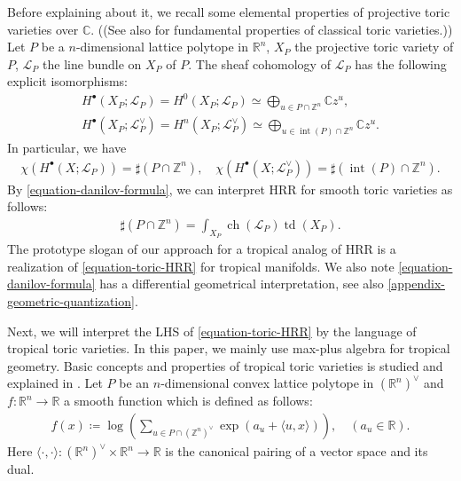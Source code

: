 \documentclass[a4paper,dvipdfmx,reqno,12pt]{amsart}
\theoremstyle{definition}
\newcommand{\deq}{\coloneqq}
\newcommand{\opn}[1]{\operatorname{#1}}
\newcommand{\abk}[1]{\langle {#1} \rangle}%
\numberwithin{equation}{section}
\begin{document}
Before explaining about it, we recall some 
elemental properties of projective toric varieties over 
$\mathbb{C}$.
((See also \cite{MR2810322} for fundamental
properties of classical toric varieties.))
Let $P$ be a $n$-dimensional lattice polytope in 
$\mathbb{R}^{n}$, $X_P$ the projective toric variety
of $P$, $\mathcal{L}_P$ the line bundle on 
$X_P$ of $P$.
The sheaf cohomology of $\mathcal{L}_P$ has 
the following explicit isomorphisms:
\begin{align}
H^{\bullet}(X_P;\mathcal{L}_P)=
H^{0}(X_P;\mathcal{L}_P)\simeq
\bigoplus_{u\in P\cap \mathbb{Z}^{n}} \mathbb{C}z^{u},
\label{equation-danilov-formula} \\
H^{\bullet}(X_P;\mathcal{L}_P^{\vee})=
H^{n}(X_P;\mathcal{L}_P^{\vee})\simeq 
\bigoplus_{u\in \opn{int}(P)\cap \mathbb{Z}^{n}}\mathbb{C}z^{u}.
\end{align}
In particular, we have
\begin{align}
\chi(H^{\bullet}(X;\mathcal{L}_P))=
\sharp (P\cap \mathbb{Z}^{n}), \quad 
\chi(H^{\bullet}(X;\mathcal{L}_P^{\vee}))=
\sharp (\opn{int}(P)\cap \mathbb{Z}^{n}).
\end{align}
By \cref{equation-danilov-formula}, we can interpret HRR 
for smooth toric varieties 
as follows:
\begin{align}
\label{equation-toric-HRR}
\sharp (P\cap \mathbb{Z}^{n})
=\int_{X_P}\opn{ch}(\mathcal{L}_P)\opn{td}(X_P).
\end{align}
The prototype slogan of our approach
for a tropical analog of HRR is 
a realization of \cref{equation-toric-HRR}
for tropical manifolds.
We also note \cref{equation-danilov-formula} 
has a differential geometrical interpretation,
see also \cref{appendix-geometric-quantization}. 


Next, we will interpret the LHS of 
\cref{equation-toric-HRR} by the language
of tropical toric varieties.
In this paper, we mainly use max-plus algebra for 
tropical geometry.
Basic concepts and properties 
of tropical toric varieties is studied and 
explained in \cite{MR2428356,MR2511632,meyer2011intersection,MR3287221}.
Let $P$ be an $n$-dimensional convex lattice polytope in
$(\mathbb{R}^{n})^{\vee}$ and
$f\colon \mathbb{R}^{n} \to \mathbb{R}$ a 
smooth function which is defined as follows:
\begin{align}
  f(x)\deq\log (\sum_{u\in P\cap (\mathbb{Z}^{n})^{\vee}} 
\opn{exp}(a_u+\abk{u,x})),\quad  (a_u\in \mathbb{R}).
\label{equation-log-polynomial} 
\end{align}
Here 
$\abk{\cdot,\cdot}\colon 
(\mathbb{R}^{n})^{\vee}\times \mathbb{R}^{n}\to\mathbb{R}$
is the canonical pairing of a vector space and its dual.
\end{document}
